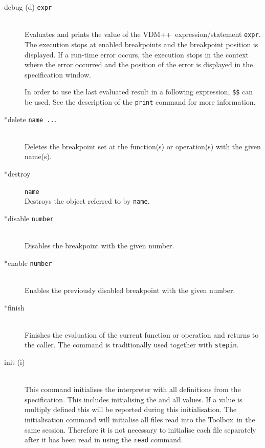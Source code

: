 \documentclass[\pformat,12pt]{article}
\newcommand{\vdmslpp}{VDM++}
\newcommand{\Toolbox}{Toolbox}
\begin{document}
\begin{description}
\item[debug (d) {\tt expr}]  \mbox{}\\
  Evaluates and prints the value of the \vdmslpp\ expression/statement
  {\tt expr}.  The execution stops at enabled breakpoints
   and the breakpoint position is displayed. If a
  run-time error occurs, the execution stops in the context
  where the error occurred and the position of the error is
  displayed in the specification window.
  
  In order to use the last evaluated result in a following
  expression, {\tt \$\$}\index{\$\$} can be used. See the description
  of the {\tt print} command for more information.
    
\item[*delete {\tt name ...}] \mbox{}\\
  Deletes the breakpoint set at the function(s) or
  operation(s) with the given
  name(s). 
\item[*destroy] {\tt name}\mbox{}\\
  Destroys the object referred to by {\tt name}.

\item[*disable \texttt{number}]
\mbox{}\\
  Disables the breakpoint with the given number.

\item[*enable \texttt{number}]
\mbox{}\\
  Enables the previously disabled breakpoint with the given number.

\item[*finish]\mbox{}\\
  Finishes the evaluation of the current function or
  operation and returns to the
  caller. The command is traditionally used together with {\tt stepin}.


\item[init (i)] \mbox{}\\ This command initialises
  the interpreter with all definitions from the specification. This
  includes initialising the
   and all
  values. If a value is multiply defined this will be reported during
  this initialisation. The initialisation command will initialise all
  files read into the \Toolbox\ in the same session. Therefore it is
  not necessary to initialise each file separately after it has been
  read in using the {\tt read} command.


\end{description}
\end{document}
